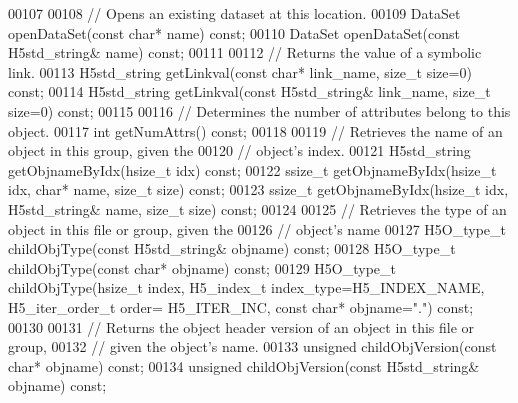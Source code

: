 \begin{DoxyCode}
00107 
00108         \textcolor{comment}{// Opens an existing dataset at this location.}
00109         DataSet openDataSet(\textcolor{keyword}{const} \textcolor{keywordtype}{char}* name) \textcolor{keyword}{const};
00110         DataSet openDataSet(\textcolor{keyword}{const} H5std\_string& name) \textcolor{keyword}{const};
00111 
00112         \textcolor{comment}{// Returns the value of a symbolic link.}
00113         H5std\_string getLinkval(\textcolor{keyword}{const} \textcolor{keywordtype}{char}* link\_name, \textcolor{keywordtype}{size\_t} size=0) \textcolor{keyword}{const};
00114         H5std\_string getLinkval(\textcolor{keyword}{const} H5std\_string& link\_name, \textcolor{keywordtype}{size\_t} size=0) \textcolor{keyword}{const};
00115 
00116         \textcolor{comment}{// Determines the number of attributes belong to this object.}
00117         \textcolor{keywordtype}{int} getNumAttrs() \textcolor{keyword}{const};
00118 
00119         \textcolor{comment}{// Retrieves the name of an object in this group, given the}
00120         \textcolor{comment}{// object's index.}
00121         H5std\_string getObjnameByIdx(hsize\_t idx) \textcolor{keyword}{const};
00122         ssize\_t getObjnameByIdx(hsize\_t idx, \textcolor{keywordtype}{char}* name, \textcolor{keywordtype}{size\_t} size) \textcolor{keyword}{const};
00123         ssize\_t getObjnameByIdx(hsize\_t idx, H5std\_string& name, \textcolor{keywordtype}{size\_t} size) \textcolor{keyword}{const};
00124 
00125         \textcolor{comment}{// Retrieves the type of an object in this file or group, given the}
00126         \textcolor{comment}{// object's name}
00127         H5O\_type\_t childObjType(\textcolor{keyword}{const} H5std\_string& objname) \textcolor{keyword}{const};
00128         H5O\_type\_t childObjType(\textcolor{keyword}{const} \textcolor{keywordtype}{char}* objname) \textcolor{keyword}{const};
00129         H5O\_type\_t childObjType(hsize\_t index, H5\_index\_t index\_type=H5\_INDEX\_NAME, H5\_iter\_order\_t order=
      H5\_ITER\_INC, \textcolor{keyword}{const} \textcolor{keywordtype}{char}* objname=\textcolor{stringliteral}{"."}) \textcolor{keyword}{const};
00130 
00131         \textcolor{comment}{// Returns the object header version of an object in this file or group,}
00132         \textcolor{comment}{// given the object's name.}
00133         \textcolor{keywordtype}{unsigned} childObjVersion(\textcolor{keyword}{const} \textcolor{keywordtype}{char}* objname) \textcolor{keyword}{const};
00134         \textcolor{keywordtype}{unsigned} childObjVersion(\textcolor{keyword}{const} H5std\_string& objname) \textcolor{keyword}{const};

\end{DoxyCode}
